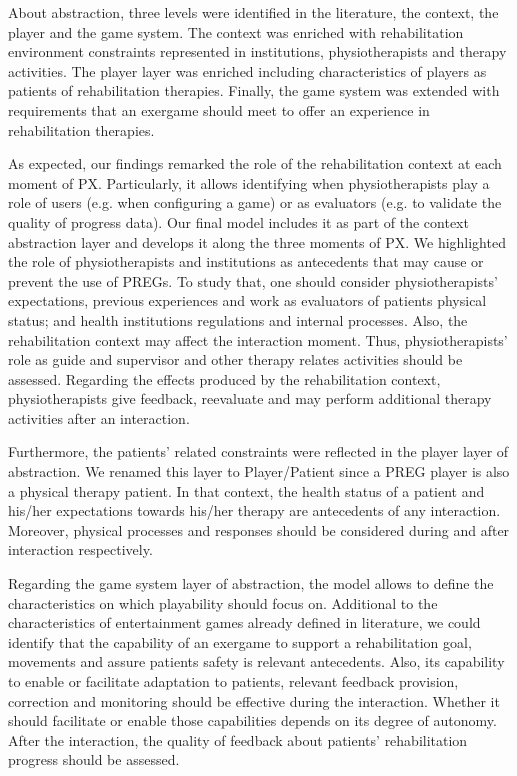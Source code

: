 About abstraction, three levels were identified in the literature, the context, the player and the game system. The context was enriched with rehabilitation environment constraints represented in institutions, physiotherapists and therapy activities. The player layer was enriched including characteristics of players as patients of rehabilitation therapies. Finally, the game system was extended with requirements that an exergame should meet to offer an experience in rehabilitation therapies.

As expected, our findings remarked the role of the rehabilitation context at each moment of \ac{PX}. Particularly, it allows identifying when physiotherapists play a role of users (e.g. when configuring a game) or as evaluators (e.g. to validate the quality of progress data). Our final model includes it as part of the context abstraction layer and develops it along the three moments of \ac{PX}. We highlighted the role of physiotherapists and institutions as antecedents that may cause or prevent the use of \acp{PREG}. To study that, one should consider physiotherapists' expectations, previous experiences and work as evaluators of patients physical status; and health institutions regulations and internal processes. Also, the rehabilitation context may affect the interaction moment. Thus, physiotherapists' role as guide and supervisor and other therapy relates activities should be assessed. Regarding the effects produced by the rehabilitation context, physiotherapists give feedback, reevaluate and may perform additional therapy activities after an interaction.

Furthermore, the patients' related constraints were reflected in the player layer of abstraction. We renamed this layer to Player/Patient since a \ac{PREG} player is also a physical therapy patient. In that context, the health status of a patient and his/her expectations towards his/her therapy are antecedents of any interaction. Moreover, physical processes and responses should be considered during and after interaction respectively.

Regarding the game system layer of abstraction, the model allows to define the characteristics on which playability should focus on. Additional to the characteristics of entertainment games already defined in literature, we could identify that the capability of an exergame to support a rehabilitation goal, movements and assure patients safety is relevant antecedents. Also, its capability to enable or facilitate adaptation to patients, relevant feedback provision, correction and monitoring should be effective during the interaction. Whether it should facilitate or enable those capabilities depends on its degree of autonomy. After the interaction, the quality of feedback about patients' rehabilitation progress should be assessed.

